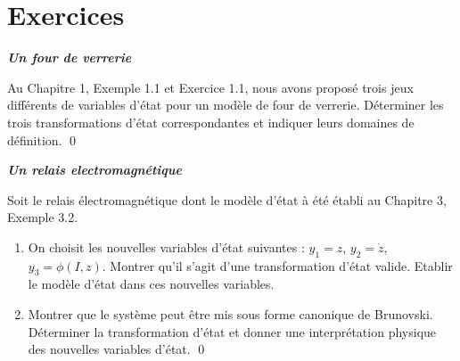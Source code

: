 \section{Exercices}

\begin{exercice}{\bf \em Un four de verrerie}

Au Chapitre 1, Exemple 1.1 et Exercice 1.1, nous avons proposé trois jeux différents de variables d'état pour un modèle de four de verrerie. Déterminer les trois transformations d'état correspondantes et indiquer leurs domaines de définition. \qed
\end{exercice}
\vv


\begin{exercice}{\bf \em Un relais electromagnétique}

Soit le relais électromagnétique dont le modèle d'état à été
établi au Chapitre 3, Exemple 3.2.
\begin{enumerate}
\item On choisit les nouvelles variables d'état suivantes : $y_1 = z$,
$y_2 = \dot z$, $y_3 = \phi(I,z)$. Montrer qu'il s'agit d'une
transformation d'état valide. Etablir le modèle d'état dans ces
nouvelles variables.
\item Montrer que le système peut être mis sous forme canonique de
Brunovski. Déterminer la transformation d'état et donner une
interprétation physique des nouvelles variables d'état. \qed
\end{enumerate}
\end{exercice}
\vv

